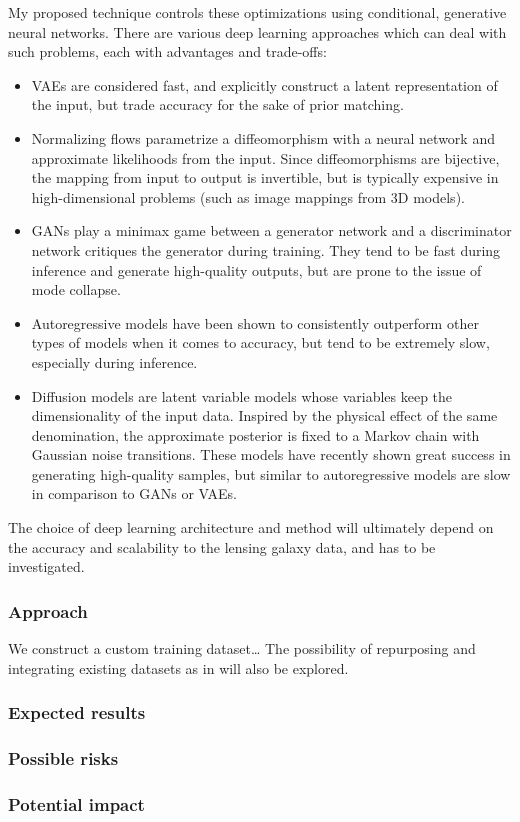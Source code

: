\documentclass[a4paper,10pt]{article}
\begin{document}
My proposed technique controls these optimizations using conditional,
generative neural networks. There are various deep learning approaches
which can deal with such problems, each with advantages and
trade-offs:
\begin{itemize}
\item VAEs \citep{Kingma13} are considered fast, and explicitly
construct a latent representation of the input, but trade accuracy
for the sake of prior matching.
\item Normalizing flows \citep{Rezende15} parametrize a diffeomorphism
with a neural network and approximate likelihoods from the
input. Since diffeomorphisms are bijective, the mapping from input
to output is invertible, but is typically expensive in
high-dimensional problems (such as image mappings from 3D models).
\item GANs \citep{Goodfellow14} play a minimax game between a generator
network and a discriminator network critiques the generator during
training. They tend to be fast during inference and generate
high-quality outputs, but are prone to the issue of mode collapse.
\item Autoregressive models \citep{Parmar18} have been shown to consistently outperform
other types of models when it comes to accuracy, but tend to be
extremely slow, especially during inference.
\item Diffusion models \citep{Sohl-Dickstein15,Ho20} are latent
variable models whose variables keep the dimensionality of the input
data. Inspired by the physical effect of the same denomination, the
approximate posterior is fixed to a Markov chain with Gaussian noise
transitions. These models have recently shown great success in
generating high-quality samples, but similar to autoregressive
models are slow in comparison to GANs or VAEs.
\end{itemize}

The choice of deep learning architecture and method will ultimately
depend on the accuracy and scalability to the lensing galaxy data, and
has to be investigated.

\subsubsection*{Approach}
\label{sec:org8e8ff5e}

We construct a custom training dataset\ldots{}
The possibility of repurposing and integrating
existing datasets as in \cite{Adam22} will also be explored.

\subsubsection*{Expected results}
\label{sec:orgf57e5c2}
\subsubsection*{Possible risks}
\label{sec:org8d97a3b}
\subsubsection*{Potential impact}
\label{sec:orgec04fd5}





\end{document}
